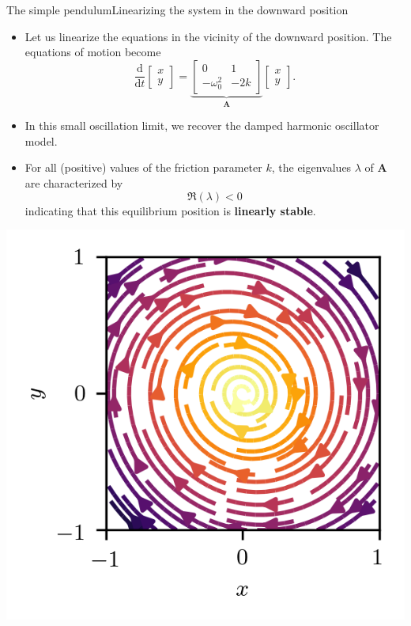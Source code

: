 \documentclass[usenames,dvipsnames,svgnames,10pt,aspectratio=169]{beamer}
\begin{document}
\begin{frame}[t, c]{The simple pendulum}{Linearizing the system in the downward position}
	\begin{minipage}{.68\textwidth}
		\begin{itemize}
			\item Let us linearize the equations in the vicinity of the downward position.
			The equations of motion become
			\[
				\displaystyle \frac{\mathrm{d}}{\mathrm{d}t} \begin{bmatrix} x \\ y \end{bmatrix} = \underbrace{\begin{bmatrix} 0 & 1 \\ -\omega_0^2 & -2k \end{bmatrix}}_{\bm{A}} \begin{bmatrix} x \\ y \end{bmatrix}.
			\]

			\item In this small oscillation limit, we recover the damped harmonic oscillator model.

			\item For all (positive) values of the friction parameter \(k\), the eigenvalues \( \lambda \) of \( \bm{A} \) are characterized by
			\[
				\Re(\lambda) < 0
			\]
			indicating that this equilibrium position is \alert{\textbf{linearly stable}}.
		\end{itemize}
	\end{minipage}%
	\hfill
	\begin{minipage}{.28\textwidth}
		\centering
		\includegraphics[width=\textwidth]{pendulum_downward_stab}
	\end{minipage}

	\vspace{1cm}
\end{frame}
\end{document}
